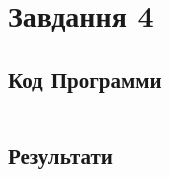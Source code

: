 \section{Завдання 4}
\label{sec:task4}

\subsection{Код Программи}
\label{subsec:task4_code}
\inputminted{python}{../src/task4.py}

\subsection{Результати}
\label{subsec:task4_results}
